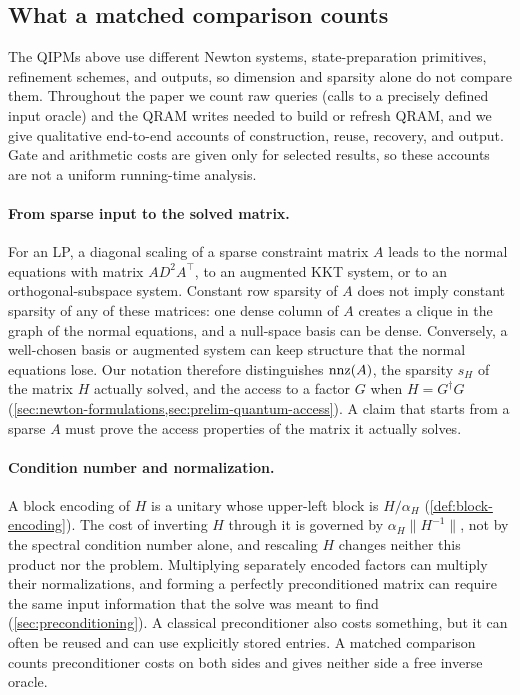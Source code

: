 \subsection{What a matched comparison counts}
\label{sec:introduction-ledgers}

The QIPMs above use different Newton systems, state-preparation primitives,
refinement schemes, and outputs, so dimension and sparsity alone do not
compare them.  Throughout the paper we count raw queries (calls to a
precisely defined input oracle) and the QRAM writes needed to build or
refresh QRAM, and we give qualitative end-to-end accounts of construction,
reuse, recovery, and output.  Gate and arithmetic costs are given only for
selected results, so these accounts are not a uniform running-time
analysis.

\paragraph{From sparse input to the solved matrix.}
For an LP, a diagonal scaling of a sparse constraint matrix \(A\) leads to
the normal equations with matrix \(AD^2A^\top\), to an augmented KKT system,
or to an orthogonal-subspace system.  Constant row sparsity of \(A\) does not
imply constant sparsity of any of these matrices: one dense column of \(A\)
creates a clique in the graph of the normal equations, and a null-space basis
can be dense.  Conversely, a well-chosen basis or augmented system can keep
structure that the normal equations lose.  Our notation therefore
distinguishes \(\operatorname{nnz}(A)\), the sparsity \(s_H\) of the matrix \(H\) actually
solved, and the access to a factor \(G\) when \(H=G^\dagger G\)
(\cref{sec:newton-formulations,sec:prelim-quantum-access}).  A claim that
starts from a sparse \(A\) must prove the access properties of the matrix it
actually solves.

\paragraph{Condition number and normalization.}
A block encoding of \(H\) is a unitary whose upper-left block is
\(H/\alpha_H\) (\cref{def:block-encoding}).  The cost of inverting \(H\)
through it is governed by \(\alpha_H\lVert H^{-1}\rVert\), not by the
spectral condition number alone, and rescaling \(H\) changes neither this
product nor the problem.  Multiplying separately encoded factors can multiply
their normalizations, and forming a perfectly preconditioned matrix can
require the same input information that the solve was meant to find
(\cref{sec:preconditioning}).  A classical
preconditioner also costs something, but it can often be reused and can use
explicitly stored entries.  A matched comparison counts preconditioner costs
on both sides and gives neither side a free inverse oracle.

